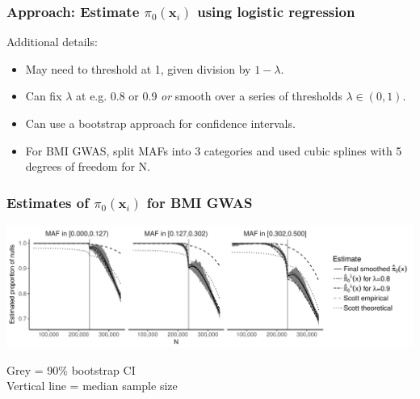 \documentclass{beamer}
\newcommand{\bx}{\mathbf{x}}
\begin{document}

\begin{frame}
\frametitle{Approach: Estimate $\pi_0(\bx_i)$ using logistic regression}

Additional details:

\begin{itemize}
\item May need to threshold at 1, given division by $1-\lambda$.
\item Can fix $\lambda$ at e.g. 0.8 or 0.9 \textit{or} smooth over a series of thresholds $\lambda \in (0,1)$.
\item Can use a bootstrap approach for confidence intervals.
\item For BMI GWAS, split MAFs into 3 categories and used cubic splines with 5 degrees of freedom for N.
\end{itemize}

\end{frame}


\begin{frame}
\frametitle{Estimates of $\pi_0(\bx_i)$ for BMI GWAS}

\begin{center}
\includegraphics[scale=0.48]{Fig2-1.pdf} 
\end{center}

Grey = 90\% bootstrap CI \\
Vertical line = median sample size

\end{frame}

\end{document}

